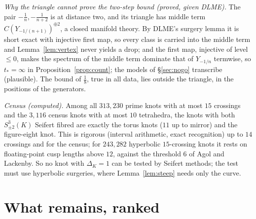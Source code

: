 \documentclass[10pt]{amsart}
\numberwithin{equation}{section}
\theoremstyle{compact}
\theoremstyle{definition}
\newcommand{\st}[1]{\par\noindent\textit{#1}\enspace}
\begin{document}
\st{Why the triangle cannot prove the two-step bound (proved, given
DLME).} The pair $-\frac1n,-\frac1{n+2}$ is at distance two, and its
triangle has middle term $C(Y_{-1/(n+1)})^{\oplus2}$, a closed manifold
theory. By DLME's surgery lemma it is short exact with injective first map,
so every class is carried into the middle term and Lemma~\ref{lem:vertex}
never yields a drop; and the first map, injective of level $\le0$, makes the
spectrum of the middle term dominate that of $Y_{-1/n}$ termwise, so
$t_*=\infty$ in Proposition~\ref{prop:count}; the models of \S\ref{sec:nogo}
transcribe (plausible). The bound of $\frac18$, true in all data, lies
outside the triangle, in the positions of the generators.

\st{Census (computed).} Among all $313{,}230$ prime knots with at most $15$
crossings and the $3{,}116$ census knots with at most $10$ tetrahedra, the
knots with both $S^3_{\pm2}(K)$ Seifert fibred are exactly the torus knots
($11$ up to mirror) and the figure-eight knot. This is rigorous (interval
arithmetic, exact recognition) up to $14$ crossings and for the census; for
$243{,}282$ hyperbolic $15$-crossing knots it rests on floating-point cusp
lengths above $12$, against the threshold $6$ of Agol and Lackenby. So no
knot with $\Delta_K=1$ can be tested by Seifert methods; the test must use
hyperbolic surgeries, where Lemma~\ref{lem:steep} needs only the curve.

\section{What remains, ranked}
\end{document}
